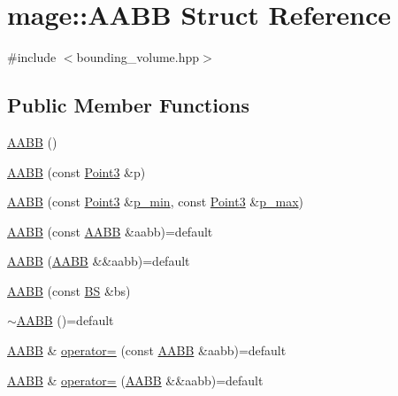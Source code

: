 \hypertarget{structmage_1_1_a_a_b_b}{}\section{mage\+:\+:A\+A\+BB Struct Reference}
\label{structmage_1_1_a_a_b_b}


{\ttfamily \#include $<$bounding\+\_\+volume.\+hpp$>$}

\subsection*{Public Member Functions}
\begin{DoxyCompactItemize}
\item 
\hyperlink{structmage_1_1_a_a_b_b_ae6db94dcb9165eb008f0be8741f0eb62}{A\+A\+BB} ()
\item 
\hyperlink{structmage_1_1_a_a_b_b_a03a5ca9571075c5e12c5e7a4a38913bf}{A\+A\+BB} (const \hyperlink{structmage_1_1_point3}{Point3} \&p)
\item 
\hyperlink{structmage_1_1_a_a_b_b_aff9e36907c435c74cc948a13cc9f1222}{A\+A\+BB} (const \hyperlink{structmage_1_1_point3}{Point3} \&\hyperlink{structmage_1_1_a_a_b_b_a600c62081fd3516c0be64bb81495cd1d}{p\+\_\+min}, const \hyperlink{structmage_1_1_point3}{Point3} \&\hyperlink{structmage_1_1_a_a_b_b_ad0a69206176c61ce9a71f2ddb0e5deb2}{p\+\_\+max})
\item 
\hyperlink{structmage_1_1_a_a_b_b_a07266c753cdfda4129ece8d605714e08}{A\+A\+BB} (const \hyperlink{structmage_1_1_a_a_b_b}{A\+A\+BB} \&aabb)=default
\item 
\hyperlink{structmage_1_1_a_a_b_b_a4de1911a46f6c2603ddba3c3348233f1}{A\+A\+BB} (\hyperlink{structmage_1_1_a_a_b_b}{A\+A\+BB} \&\&aabb)=default
\item 
\hyperlink{structmage_1_1_a_a_b_b_a2be79f65a33fa973ca0b71570d96b7cc}{A\+A\+BB} (const \hyperlink{structmage_1_1_b_s}{BS} \&bs)
\item 
\hyperlink{structmage_1_1_a_a_b_b_a0fa31372f7488cb30b886c77bd676f17}{$\sim$\+A\+A\+BB} ()=default
\item 
\hyperlink{structmage_1_1_a_a_b_b}{A\+A\+BB} \& \hyperlink{structmage_1_1_a_a_b_b_a5366c42bc506842e4c58a941c4a08f43}{operator=} (const \hyperlink{structmage_1_1_a_a_b_b}{A\+A\+BB} \&aabb)=default
\item 
\hyperlink{structmage_1_1_a_a_b_b}{A\+A\+BB} \& \hyperlink{structmage_1_1_a_a_b_b_a5ca72f9aabc219cd598af6eab6b8b99f}{operator=} (\hyperlink{structmage_1_1_a_a_b_b}{A\+A\+BB} \&\&aabb)=default

\end{DoxyCompactItemize}
